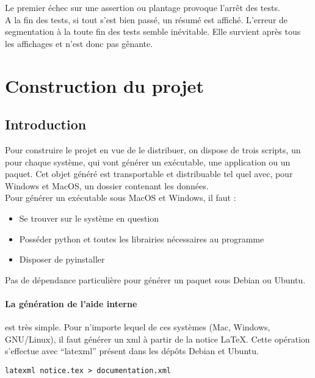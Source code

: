 \documentclass[12pt,a4paper]{article}
\begin{document}
    Le premier échec sur une assertion ou plantage provoque l'arrêt des tests.\\

    A la fin des tests, si tout s'est bien passé, un résumé est affiché.
    L'erreur de segmentation à la toute fin des tests semble inévitable. Elle
    survient après tous les affichages et n'est donc pas gênante.


\section{Construction du projet}

    \subsection{Introduction}
    Pour construire le projet en vue de le distribuer, on dispose de trois
    scripts, un pour chaque système, qui vont générer un exécutable, une
    application ou un paquet. Cet objet généré est transportable et distribuable
    tel quel avec, pour Windows et MacOS, un dossier contenant les données.\\

    Pour générer un exécutable sous MacOS et Windows, il faut : 
    \begin{itemize}
    \item Se trouver sur le système en question
    \item Posséder python et toutes les librairies nécessaires au programme
    \item Disposer de pyinstaller\\
    \end{itemize}

    Pas de dépendance particulière pour générer un paquet sous Debian ou
    Ubuntu.\\

    \paragraph{La génération de l'aide interne} est très simple.
    \label{howtoLatexml}
    Pour n'importe lequel de ces systèmes (Mac, Windows, GNU/Linux), il faut
    générer un xml à partir de la notice \LaTeX . Cette opération s'effectue
    avec ``latexml'' présent dans les dépôts Debian et Ubuntu. \\
    \begin{verbatim}latexml notice.tex > documentation.xml\end{verbatim}
\end{document}
